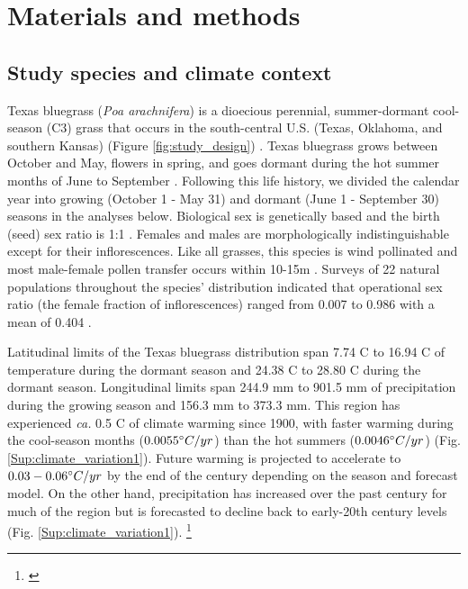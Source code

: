 \documentclass[12pt]{article}\usepackage[]{graphicx}\usepackage[dvipsnames]{xcolor}
\newcommand{\jacob}[2]{{\color{blue}{#1}}\footnote{\textit{\color{blue}{#2}}}}
\begin{document}
\section*{Materials and methods}
\subsection*{Study species and climate context}
Texas bluegrass (\textit{Poa arachnifera}) is a dioecious perennial, summer-dormant cool-season (C3) grass that occurs in the south-central U.S. (Texas, Oklahoma, and southern Kansas) (Figure \ref{fig:study_design}) \citep{hitchcock1971manual}. 
Texas bluegrass grows between October and May, flowers in spring, and goes dormant during the hot summer months of June to September \citep{kindiger2004interspecific}. 
Following this life history, we divided the calendar year into growing (October 1 - May 31) and dormant (June 1 - September 30) seasons in the analyses below. 
Biological sex is genetically based and the birth (seed) sex ratio is 1:1 \citep{renganayaki2005identification}. 
Females and males are morphologically indistinguishable except for their inflorescences. 
Like all grasses, this species is wind pollinated \citep{hitchcock1971manual} and most male-female pollen transfer occurs within 10-15m \citep{compagnoni2017can}. 
Surveys of 22 natural populations throughout the species' distribution indicated that operational sex ratio (the female fraction of inflorescences) ranged from 0.007 to 0.986 with a mean of 0.404 \citep{miller2022two}. 

Latitudinal limits of the Texas bluegrass distribution span 7.74 \degree C to 16.94 \degree C of temperature during the dormant season and 24.38 \degree C to 28.80 \degree C  during the dormant season. 
Longitudinal limits span 244.9 mm to 901.5 mm of precipitation during the growing season and 156.3 mm to 373.3 mm. 
This region has experienced \textit{ca.} 0.5 \degree C of climate warming since 1900, with faster warming  during the cool-season months ($0.0055 \degree C / yr$) than the hot summers ($0.0046\degree C / yr$) (Fig. \ref{Sup:climate_variation1}).
Future warming is projected to accelerate to $0.03-0.06\degree C / yr$ by the end of the century depending on the season and forecast model. 
On the other hand, precipitation has increased over the past century for much of the region but is forecasted to decline back to early-20th century levels (Fig. \ref{Sup:climate_variation1}). 
\jacob{}{I like this but I don't know if this not a repetition of what we've said in the introduction about climate change in the study area. }
\end{document}
